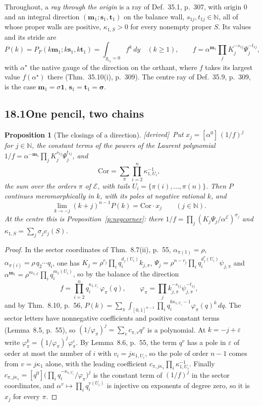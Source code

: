 \documentclass[11pt]{article}
\newcommand{\cE}{\mathcal E}
\newcommand{\one}{\mathbf 1}
\newcommand{\mvec}{\mathbf m}
\theoremstyle{plain}
\newtheorem{proposition}{Proposition}[section]
\theoremstyle{definition}
\theoremstyle{remark}
\newcommand{\derived}{\textup{[derived]}}
\begin{document}
Throughout, a \emph{ray through the origin} is a ray of Def.~35.1, p.~307, with origin $0$ and an integral direction $(\mvec_1;\mathbf s_1,\mathbf t_1)$ on the balance wall, $s_{1j},t_{1j}\in\mathbb N$, all of whose proper walls are positive, $\kappa_{1,S}>0$ for every nonempty proper $S$. Its values and its stride are
\[
P(k)=P_F(k\mvec_1;k\mathbf s_1,k\mathbf t_1)=\int_{y_{e_0}=0}f^k\,dy\quad(k\ge1),\qquad f=\alpha^{\mvec_1}\prod_jK_j^{-s_{1j}}\Psi_j^{-t_{1j}},
\]
with $\alpha^\star$ the native gauge of the direction on the orthant, where $f$ takes its largest value $f(\alpha^\star)$ there (Thm.~35.10(i), p.~309). The centre ray of Def.~35.9, p.~309, is the case $\mvec_1=\sigma\one$, $\mathbf s_1=\mathbf t_1=\boldsymbol\sigma$.

\subsection*{18.1\quad One pencil, two chains}

\begin{proposition}[The closings of a direction]\label{p:dirclose}\derived\
Put $x_j=[\alpha^0]\,(1/f)^j$ for $j\in\mathbb N$, the constant terms of the powers of the Laurent polynomial $1/f=\alpha^{-\mvec_1}\prod_jK_j^{s_{1j}}\Psi_j^{t_{1j}}$, and
\[
\mathrm{Cor}=\sum_\pi\prod_{i=2}^n\kappa_{1,U_i}^{-1},
\]
the sum over the orders $\pi$ of $\cE$, with tails $U_i=\{\pi(i),\dots,\pi(n)\}$. Then $P$ continues meromorphically in $k$, with its poles at negative rational $k$, and
\[
\lim_{k\to-j}(k+j)^{n-1}P(k)=\mathrm{Cor}\cdot x_j\qquad(j\in\mathbb N).
\]
At the centre this is Proposition~\ref{p:negcorner}: there $1/f=\prod_j(K_j\Psi_j/\alpha^{\cE})^{\sigma_j}$ and $\kappa_{1,S}=\sum_j\sigma_jc_j(S)$.
\end{proposition}

\begin{proof}
In the sector coordinates of Thm.~8.7(ii), p.~55, $\alpha_{\pi(1)}=\rho$, $\alpha_{\pi(i)}=\rho\,q_2\cdots q_i$, one has $K_j=\rho^{r_j}\prod_iq_i^{d_j(U_i)}k_{j,\pi}$, $\Psi_j=\rho^{n-r_j}\prod_iq_i^{d^\ast_j(U_i)}\psi_{j,\pi}$ and $\alpha^{\mvec_1}=\rho^{m_{1,\cE}}\prod_iq_i^{m_1(U_i)}$, so by the balance of the direction
\[
f=\prod_{i=2}^nq_i^{\kappa_{1,U_i}}\,\varphi_\pi(q),\qquad \varphi_\pi=\prod_jk_{j,\pi}^{-s_{1j}}\psi_{j,\pi}^{-t_{1j}},
\]
and by Thm.~8.10, p.~56, $P(k)=\sum_\pi\int_{[0,1]^{n-1}}\prod_iq_i^{k\kappa_{1,U_i}-1}\varphi_\pi(q)^k\,dq$. The sector letters have nonnegative coefficients and positive constant terms (Lemma~8.5, p.~55), so $(1/\varphi_\pi)^j=\sum_vc_{\pi,v}q^v$ is a polynomial. At $k=-j+\varepsilon$ write $\varphi_\pi^{k}=(1/\varphi_\pi)^j\varphi_\pi^{\varepsilon}$. By Lemma~8.6, p.~55, the term $q^v$ has a pole in $\varepsilon$ of order at most the number of $i$ with $v_i=j\kappa_{1,U_i}$, so the pole of order $n-1$ comes from $v=j\kappa_1$ alone, with the leading coefficient $c_{\pi,j\kappa_1}\prod_i\kappa_{1,U_i}^{-1}$. Finally $c_{\pi,j\kappa_1}=[q^0]\big(\prod_iq_i^{-\kappa_{1,U_i}}/\varphi_\pi\big)^j$ is the constant term of $(1/f)^j$ in the sector coordinates, and $\alpha^v\mapsto\prod_iq_i^{v(U_i)}$ is injective on exponents of degree zero, so it is $x_j$ for every $\pi$.
\end{proof}
\end{document}
